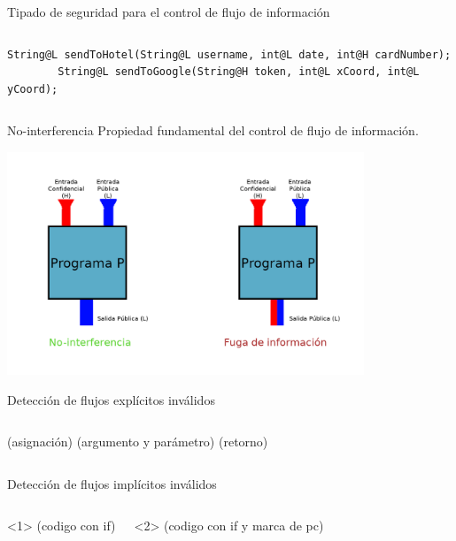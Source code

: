 \documentclass[aspectratio=169,10pt]{beamer}
\begin{document}
\begin{frame}[fragile]{Tipado de seguridad para el control de flujo de información}
\begin{columns}[T,onlytextwidth]
\begin{onlyenv}
\begin{lstlisting}[escapechar=?]
        String@L sendToHotel(String@L username, int@L date, int@H cardNumber);
        String@L sendToGoogle(String@H token, int@L xCoord, int@L yCoord);
      \end{lstlisting}
    \end{onlyenv}
  \end{columns}

\end{frame}

\begin{frame}[fragile]{No-interferencia}
  Propiedad fundamental del control de flujo de información.
	\begin{center}
		\includegraphics[width=0.8\textwidth]{images/noninterference.png}
	\end{center}

\end{frame}

\begin{frame}[fragile]{Detección de flujos explícitos inválidos}
	\begin{columns}[T,onlytextwidth]
		(asignación) \pause
		(argumento y parámetro) \pause
		(retorno)
	\end{columns}
\end{frame}

\begin{frame}[fragile]{Detección de flujos implícitos inválidos}
	\begin{columns}[T,onlytextwidth]
		\begin{onlyenv}<1>
			(codigo con if)
		\end{onlyenv}
		\begin{onlyenv}<2>
			(codigo con if y marca de pc)
		\end{onlyenv}

	\end{columns}
\end{frame}
\end{document}
